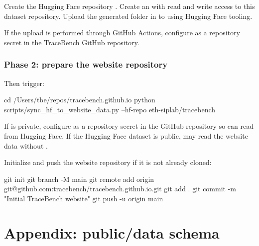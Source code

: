 \documentclass[11pt]{article}
\begin{document}
Create the Hugging Face repository .
Create an  with read and write access to this dataset repository.
Upload the generated folder in  to  using Hugging Face tooling.

If the upload is performed through GitHub Actions, configure  as a repository secret in the TraceBench GitHub repository.

\subsubsection*{Phase 2: prepare the website repository}
Then trigger:
\begin{DocCode}
cd /Users/tbe/repos/tracebench.github.io
python scripts/sync_hf_to_website_data.py --hf-repo eth-siplab/tracebench
\end{DocCode}

If  is private, configure  as a repository secret in the  GitHub repository so  can read from Hugging Face.
If the Hugging Face dataset is public,  may read the website data without .

Initialize and push the website repository if it is not already cloned:
\begin{DocCode}
git init
git branch -M main
git remote add origin git@github.com:tracebench/tracebench.github.io.git
git add .
git commit -m "Initial TraceBench website"
git push -u origin main
\end{DocCode}

\section*{Appendix: public/data schema}
\label{sec:website-generated-json}\label{sec:website-generated-json-file-list}\label{sec:website-public-data-schema-appendix}
\end{document}
